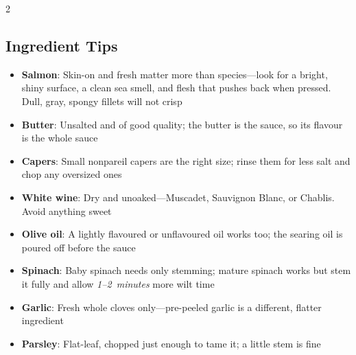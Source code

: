 \documentclass[11pt,letterpaper]{article}
\begin{document}
{\begin{multicols}{2}
\subsection*{Ingredient Tips}
\begin{itemize}
    \item \textbf{Salmon}: Skin-on and fresh matter more than species---look for a bright, shiny surface, a clean sea smell, and flesh that pushes back when pressed. Dull, gray, spongy fillets will not crisp
    \item \textbf{Butter}: Unsalted and of good quality; the butter is the sauce, so its flavour is the whole sauce
    \item \textbf{Capers}: Small nonpareil capers are the right size; rinse them for less salt and chop any oversized ones
    \item \textbf{White wine}: Dry and unoaked---Muscadet, Sauvignon Blanc, or Chablis. Avoid anything sweet
    \item \textbf{Olive oil}: A lightly flavoured or unflavoured oil works too; the searing oil is poured off before the sauce
    \item \textbf{Spinach}: Baby spinach needs only stemming; mature spinach works but stem it fully and allow \textit{1--2~minutes} more wilt time
    \item \textbf{Garlic}: Fresh whole cloves only---pre-peeled garlic is a different, flatter ingredient
    \item \textbf{Parsley}: Flat-leaf, chopped just enough to tame it; a little stem is fine
\end{itemize}


\end{multicols}}
\end{document}
